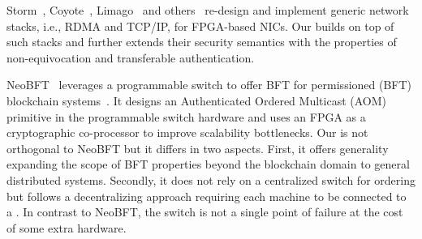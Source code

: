  Storm~\cite{storm}, Coyote~\cite{coyote}, Limago~\cite{8891991} and others~\cite{280712, 9114811} re-design and implement generic network stacks, i.e., RDMA and TCP/IP, for FPGA-based NICs. Our \projecttitle{} builds on top of such stacks and further extends their security semantics with the properties of non-equivocation and transferable authentication. %



 NeoBFT~\cite{10.1145/3603269.3604874} leverages a programmable switch to offer BFT for permissioned (BFT) blockchain systems~\cite{10.1145/3190508.3190538}. It designs an Authenticated Ordered Multicast (AOM) primitive in the programmable switch hardware and uses an FPGA as a cryptographic co-processor to improve scalability bottlenecks. Our \projecttitle{} is not orthogonal to NeoBFT but it differs in two aspects. First, it offers generality expanding the scope of BFT properties beyond the blockchain domain to general distributed systems. Secondly, it does not rely on a centralized switch for ordering but follows a decentralizing approach requiring each machine to be connected to a \projecttitle{}. In contrast to NeoBFT, the switch is not a single point of failure at the cost of some extra hardware.

